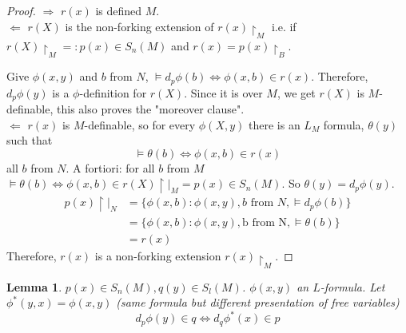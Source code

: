 \documentclass[letterpaper, 12pt]{article}
\theoremstyle{stdthm}
\newtheorem{lem}[thm]{Lemma}
\theoremstyle{stddef}
\theoremstyle{stdnonum}
\theoremstyle{stdqands}
\theoremstyle{stdbold}
\begin{document}
\begin{proof}
$\Rightarrow $ $r(x)$ is defined $M$. \\

$\Leftarrow$ $r(X)$ is the non-forking extension of $r(x)\upharpoonright_M$ i.e. if $r(X)\upharpoonright_M =: p(x) \in S_n(M)$ and $r(x) = p(x) \upharpoonright_B$.\
\

Give $\phi(x,y)$ and $b$ from $N$, $\models d_p \phi(b) \iff \phi(x,b) \in r(x)$. Therefore, $d_p \phi(y)$ is a $\phi$-definition for $r(X)$. Since it is over $M$, we get $r(X)$ is $M$-definable, this also proves the "moreover clause". \\

$\Leftarrow$  $r(x)$ is $M$-definable, so for every $\phi(X,y)$ there is an $L_M$ formula, $\theta(y)$ such that 
\[ \models \theta(b) \iff \phi(x,b) \in r(x) \] 
all $b$ from $N$. A fortiori: for all $b$ from $M$ $\models \theta(b) \iff \phi(x,b) \in r(X) \upharpoonright|_M = p(x) \in S_n(M)$. So $\theta(y) = d_p \phi(y)$. 
\begin{align*}
p(x) \upharpoonright|_N  &= \{\phi(x,b): \phi(x,y),b \text{ from } N, \models d_p \phi(b) \} \\
&= \{\phi(x,b): \phi(x,y), \text{b from N}, \models \theta(b) \} \\
&= r(x)
\end{align*}
Therefore, $r(x)$  is a non-forking extension $r(x) \upharpoonright_M$.  
\end{proof} 

\begin{lem}
$p(x) \in S_n(M), q(y) \in S_l(M)$. $\phi(x,y)$ an $L$-formula. Let $\phi^*(y,x) = \phi(x,y)$ (same formula but different presentation of free variables) 
\[ d_p \phi(y) \in q \iff d_q \phi^*(x) \in p \]
\end{lem}
\end{document}
